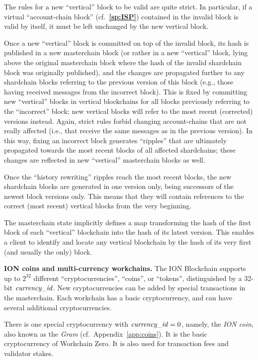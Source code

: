 \documentclass[12pt,oneside]{article}
\def\makepoint#1{\medbreak\noindent{\bf #1.\ }}
\def\nxsubpoint{\refstepcounter{subsubsection}%
  \smallbreak\makepoint{\thesubsubsection}}
\def\refpoint#1{{\rm\textbf{\ref{#1}}}}
\let\ptref=\refpoint
\def\embt(#1.){\textbf{#1.}}
\let\vr=\textit
\def\currencyid{\vr{currency\_id\/}}
\begin{document}
The rules for a new ``vertical'' block to be valid are quite
strict. In particular, if a virtual ``account-chain block''
(cf.~\ptref{sp:ISP}) contained in the invalid block is valid by
itself, it must be left unchanged by the new vertical block.

Once a new ``vertical'' block is committed on top of the invalid
block, its hash is published in a new masterchain block (or rather in
a new ``vertical'' block, lying above the original masterchain block
where the hash of the invalid shardchain block was originally
published), and the changes are propagated further to any shardchain
blocks referring to the previous version of this block (e.g., those
having received messages from the incorrect block). This is fixed by
committing new ``vertical'' blocks in vertical blockchains for all
blocks previously referring to the ``incorrect'' block; new vertical
blocks will refer to the most recent (corrected) versions
instead. Again, strict rules forbid changing account-chains that are
not really affected (i.e., that receive the same messages as in the
previous version). In this way, fixing an incorrect block generates
``ripples'' that are ultimately propagated towards the most recent
blocks of all affected shardchains; these changes are reflected in new
``vertical'' masterchain blocks as well.

Once the ``history rewriting'' ripples reach the most recent blocks,
the new shardchain blocks are generated in one version only, being
successors of the newest block versions only. This means that they
will contain references to the correct (most recent) vertical blocks
from the very beginning.

The masterchain state implicitly defines a map transforming the hash
of the first block of each ``vertical'' blockchain into the hash of
its latest version. This enables a client to identify and locate any
vertical blockchain by the hash of its very first (and usually the
only) block.

\nxsubpoint \embt(ION coins and multi-currency workchains.)  The ION
Block\-chain supports up to $2^{32}$ different ``cryptocurrencies'',
``coins'', or ``tokens'', distinguished by a 32-bit $\currencyid$. New
cryptocurrencies can be added by special transactions in the
masterchain. Each workchain has a basic cryptocurrency, and can have
several additional cryptocurrencies.

There is one special cryptocurrency with $\currencyid=0$, namely, the
{\em ION coin}, also known as the {\em Gram\/}
(cf.\ Appendix~\ref{app:coins}). It is the basic cryptocurrency of
Workchain Zero. It is also used for transaction fees and validator
stakes.
\end{document}
